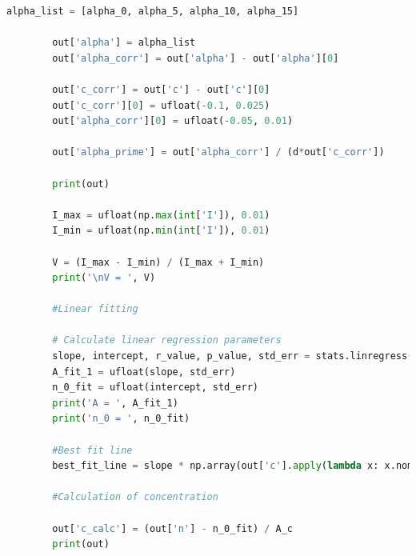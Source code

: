 \documentclass[a4paper,11pt]{article}
\begin{document}
\begin{lstlisting}[language=Python, basicstyle=\tiny, breaklines=true, postbreak=\mbox{\textbackslashspace}]
        alpha_list = [alpha_0, alpha_5, alpha_10, alpha_15]

        out['alpha'] = alpha_list
        out['alpha_corr'] = out['alpha'] - out['alpha'][0]

        out['c_corr'] = out['c'] - out['c'][0]
        out['c_corr'][0] = ufloat(-0.1, 0.025)
        out['alpha_corr'][0] = ufloat(-0.05, 0.01)
        
        out['alpha_prime'] = out['alpha_corr'] / (d*out['c_corr'])

        print(out) 

        I_max = ufloat(np.max(int['I']), 0.01)
        I_min = ufloat(np.min(int['I']), 0.01)

        V = (I_max - I_min) / (I_max + I_min)
        print('\nV = ', V)

        #Linear fitting

        # Calculate linear regression parameters
        slope, intercept, r_value, p_value, std_err = stats.linregress(out['c'].apply(lambda x: x.nominal_value), out['n'].apply(lambda x: x.nominal_value))
        A_fit_1 = ufloat(slope, std_err)
        n_0_fit = ufloat(intercept, std_err)
        print('A = ', A_fit_1)
        print('n_0 = ', n_0_fit)

        #Best fit line
        best_fit_line = slope * np.array(out['c'].apply(lambda x: x.nominal_value)) + intercept

        #Calculation of concentration

        out['c_calc'] = (out['n'] - n_0_fit) / A_c
        print(out)
    \end{lstlisting}
\end{document}
